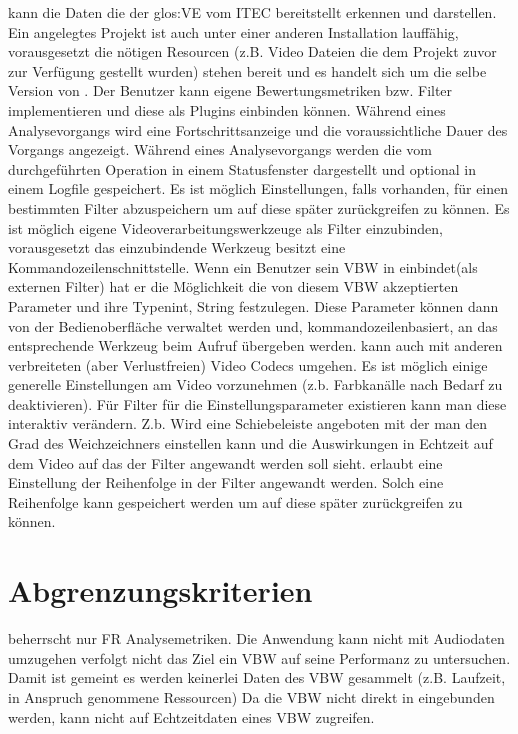  \projektTitel kann die Daten die der \gls{glos:VE} vom \gls{ITEC}  bereitstellt erkennen und darstellen.
 Ein angelegtes Projekt ist auch unter einer anderen \projektTitel Installation lauffähig, vorausgesetzt die nötigen Resourcen (z.B. Video Dateien die dem Projekt zuvor zur Verfügung gestellt wurden)  stehen bereit und es handelt sich um die selbe Version von \projektTitel.
 Der Benutzer kann eigene Bewertungsmetriken bzw. Filter implementieren und diese als Plugins einbinden können.
 Während eines Analysevorgangs wird eine Fortschrittsanzeige und die voraussichtliche Dauer des Vorgangs angezeigt.
	Während eines Analysevorgangs werden die vom \projektTitel durchgeführten Operation in einem Statusfenster dargestellt und optional in einem Logfile gespeichert.
 Es ist möglich Einstellungen, falls vorhanden, für einen bestimmten Filter abzuspeichern um auf diese später zurückgreifen zu können.
 Es ist möglich eigene Videoverarbeitungswerkzeuge als Filter einzubinden, vorausgesetzt das einzubindende Werkzeug besitzt eine Kommandozeilenschnittstelle.
 Wenn ein Benutzer sein \gls{VBW} in \projektTitel einbindet(als externen Filter) hat er die
			Möglichkeit die von diesem \gls{VBW} akzeptierten Parameter und ihre Typen{int, String}
			festzulegen. Diese Parameter können dann von der Bedienoberfläche verwaltet werden und, 
			kommandozeilenbasiert, an das entsprechende Werkzeug beim Aufruf übergeben werden.
 \projektTitel kann auch mit anderen verbreiteten (aber Verlustfreien) Video Codecs umgehen.			
	Es ist möglich einige generelle Einstellungen am Video vorzunehmen (z.b. Farbkanälle 
			nach Bedarf zu deaktivieren).
 Für Filter für die Einstellungsparameter existieren kann man diese interaktiv verändern. Z.b. Wird eine Schiebeleiste angeboten mit der man den Grad des Weichzeichners einstellen kann und die Auswirkungen in Echtzeit auf dem Video auf das der Filter angewandt werden soll sieht.
 \projektTitel erlaubt eine Einstellung der Reihenfolge in der Filter angewandt werden. Solch
			eine Reihenfolge kann gespeichert werden um auf diese später zurückgreifen zu können.
\section{Abgrenzungskriterien}
\setcounter{counterKriterien}{0}
 \projektTitel beherrscht nur \gls{FR} Analysemetriken.
 Die Anwendung kann nicht mit Audiodaten umzugehen
 \projektTitel verfolgt nicht das Ziel ein \gls{VBW} auf seine Performanz zu untersuchen. Damit ist gemeint es werden keinerlei Daten des \gls{VBW} gesammelt (z.B. Laufzeit, in Anspruch genommene Ressourcen)
 Da die \gls{VBW} nicht direkt in \projektTitel eingebunden
			werden, kann \projektTitel nicht auf Echtzeitdaten eines \gls{VBW} zugreifen.

